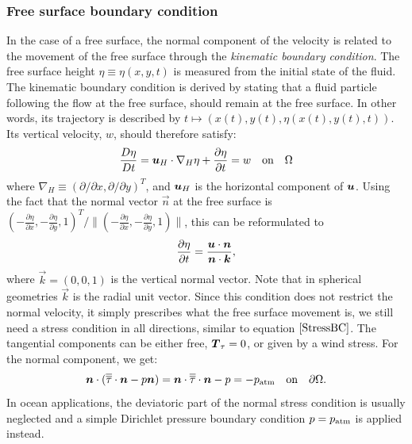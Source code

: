 \subsubsection{Free surface boundary condition}\label{sec:FS}
In the case of a free surface, the normal component of the velocity is related
to the movement of the free surface through the \emph{kinematic boundary
condition}. The free surface height $\eta\equiv\eta(x,y,t)$ is measured from
the initial state of the fluid. The kinematic boundary condition is derived by
stating that a fluid particle following the flow at the free surface, should
remain at the free surface. In other words, its trajectory is described by
$t\mapsto (x(t), y(t),\eta(x(t),y(t),t))$. Its vertical velocity, $w$, should
therefore satisfy:
\begin{equation} \label{eq:kinematicbc1}
  \frac{D\eta}{Dt}={\mbox{\boldmath$u$}}_H \cdot\nabla_H \eta +
  \frac{\partial\eta}{\partial t} = w \quad \textrm{on}\quad \Omega
\end{equation}
where $\nabla_H\equiv(\partial/\partial x,\partial/\partial y)^T$, and
${\mbox{\boldmath$u$}}_H$ is the horizontal component of ${\mbox{\boldmath$u$}}$.
Using the fact that the normal vector $\vec n$ at the free surface is
$(-\frac{\partial \eta}{\partial x},-\frac{\partial \eta}{\partial y}, 1)^T/
\|(-\frac{\partial \eta}{\partial x},-\frac{\partial \eta}{\partial y}, 1)\|$,
this can be reformulated to
\begin{equation}\label{freesurf3}
\frac{\partial \eta}{\partial t}=\frac{{\mbox{\boldmath$u$}} \cdot {\mbox{\boldmath$n$}}}{{\mbox{\boldmath$n$}} \cdot {\mbox{\boldmath$k$}}},
\end{equation}
where $\vec k=(0,0,1)$ is the vertical normal vector. Note that in spherical
geometries $\vec k$ is the radial unit vector. Since this condition does not
restrict the normal velocity, it simply
prescribes what the free surface movement is, we still need a stress condition
in all directions, similar to equation $\eqref{StressBC}$. The tangential
components can be either free, ${\mbox{\boldmath$T$}}_\tau=0$, or given by a wind stress. For the
normal component, we get:
\begin{equation}
  {\mbox{\boldmath$n$}}\cdot(\overline{\overline{\tau}}\cdot{\mbox{\boldmath$n$}} - p{\mbox{\boldmath$n$}}) = {\mbox{\boldmath$n$}}\cdot\overline{\overline{\tau}}\cdot{\mbox{\boldmath$n$}} - p =
  -p_{\text{atm}} \quad \textrm{on}\quad \partial\Omega.
  \label{NormalStressBC}
\end{equation}
In ocean applications, the deviatoric part of the normal stress condition is
usually neglected and a simple Dirichlet pressure boundary condition $p=p_{\text{atm}}$
is applied instead.

